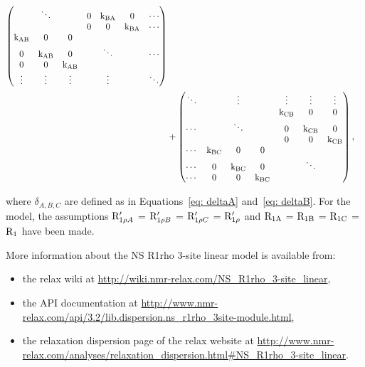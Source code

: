 \begin{align}
\begin{pmatrix}
                   & \ddots  &         & 0       & \textrm{k}_{\textrm{BA}}    & 0       & \cdots \\
                   &         &         & 0       & 0       & \textrm{k}_{\textrm{BA}}    & \cdots \\
           \textrm{k}_{\textrm{AB}}    & 0       & 0       &         &         &         & \\
           0       & \textrm{k}_{\textrm{AB}}    & 0       &         & \ddots  &         & \cdots\\
           0       & 0       & \textrm{k}_{\textrm{AB}}    &         &         &         & \\
           \vdots  & \vdots  & \vdots  &         & \vdots  &         & \ddots \\
         \end{pmatrix} \nonumber \\
      &+ \begin{pmatrix}
           \ddots  &         & \vdots  &         & \vdots  & \vdots  & \vdots \\
                   &         &         &         & \textrm{k}_{\textrm{CB}}    & 0       & 0 \\
           \cdots  &         & \ddots  &         & 0       & \textrm{k}_{\textrm{CB}}    & 0 \\
                   &         &         &         & 0       & 0       & \textrm{k}_{\textrm{CB}} \\
           \cdots  & \textrm{k}_{\textrm{BC}}    & 0       & 0       &         &         &  \\
           \cdots  & 0       & \textrm{k}_{\textrm{BC}}    & 0       &         & \ddots  &  \\
           \cdots  & 0       & 0       & \textrm{k}_{\textrm{BC}}    &         &         &  \\
         \end{pmatrix},
\end{align}

where $\delta_{A,B,C}$ are defined as in Equations~\ref{eq: deltaA} and~\ref{eq: deltaB}.
For the model, the assumptions $\mathrm{R}_{1\rho A}'$ = $\mathrm{R}_{1\rho B}'$ = $\mathrm{R}_{1\rho C}'$ = $\mathrm{R}_{1\rho}'$ and  $\mathrm{R}_{\textrm{1A}}$ = $\mathrm{R}_{\textrm{1B}}$ = $\mathrm{R}_{\textrm{1C}}$ = $\mathrm{R}_1$ have been made.

More information about the NS R1rho 3-site linear model is available from:
\begin{itemize}
  \item the relax wiki at \url{http://wiki.nmr-relax.com/NS\_R1rho\_3-site\_linear},
  \item the API documentation at \url{http://www.nmr-relax.com/api/3.2/lib.dispersion.ns\_r1rho\_3site-module.html},
  \item the relaxation dispersion page of the relax website at \url{http://www.nmr-relax.com/analyses/relaxation\_dispersion.html#NS\_R1rho\_3-site\_linear}.
\end{itemize}



